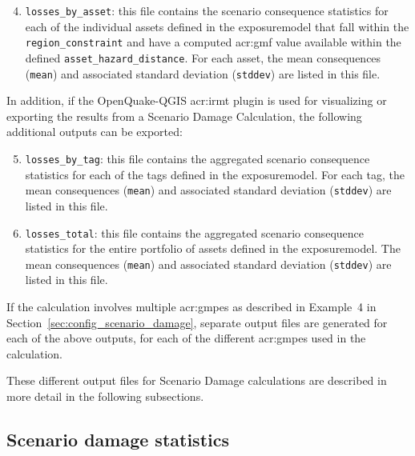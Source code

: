 \begin{enumerate}
\setcounter{enumi}{3}

  \item \Verb+losses_by_asset+: this file contains the scenario consequence
    statistics for each of the individual \glspl{asset} defined in the
    \gls{exposuremodel} that fall within the \Verb+region_constraint+ and have
    a computed \gls{acr:gmf} value available within the defined
    \Verb+asset_hazard_distance+. For each \gls{asset}, the mean consequences
    (\Verb+mean+) and associated standard deviation (\Verb+stddev+) are listed
    in this file.

\end{enumerate}

In addition, if the OpenQuake-QGIS \gls{acr:irmt} plugin is used for
visualizing or exporting the results from a Scenario Damage Calculation, the
following additional outputs can be exported:

\begin{enumerate}
\setcounter{enumi}{4}

  \item \Verb+losses_by_tag+: this file contains the aggregated scenario
    consequence statistics for each of the \glspl{tag} defined in the
    \gls{exposuremodel}. For each \gls{tag}, the mean consequences
    (\Verb+mean+) and associated standard deviation (\Verb+stddev+) are listed
    in this file.

  \item \Verb+losses_total+: this file contains the aggregated scenario
    consequence statistics for the entire portfolio of \glspl{asset} defined
    in the \gls{exposuremodel}. The mean consequences (\Verb+mean+) and 
    associated standard deviation (\Verb+stddev+) are listed in this file.

\end{enumerate}

If the calculation involves multiple \glspl{acr:gmpe} as described in
Example~4 in Section~\ref{sec:config_scenario_damage}, separate output files
are generated for each of the above outputs, for each of the different
\glspl{acr:gmpe} used in the calculation.

These different output files for Scenario Damage calculations are described in
more detail in the following subsections.


\subsection{Scenario damage statistics}
\label{subsec:scenario_damage_statistics}

